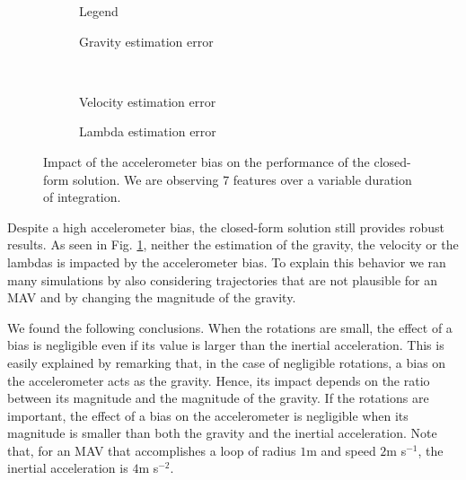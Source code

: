 \documentclass[letterpaper, 10 pt, journal, twoside]{IEEEtran}  %
\begin{document}
\begin{figure}[!h]
  \centering
        \hspace{0.2\columnwidth}%
        \begin{subfigure}[b]{0.3\columnwidth}
                \resizebox{\columnwidth}{!}{}
                \caption{Legend}

        \end{subfigure}%
        \begin{subfigure}[b]{0.5\columnwidth}
                \resizebox{\columnwidth}{!}{}
                \caption{Gravity estimation error}

        \end{subfigure}
        ~
        \begin{subfigure}[b]{0.5\columnwidth}
                \resizebox{\columnwidth}{!}{}
                \caption{Velocity estimation error}

        \end{subfigure}%
        \begin{subfigure}[b]{0.5\columnwidth}
                \resizebox{\columnwidth}{!}{}
                \caption{Lambda estimation error}

        \end{subfigure}
        \caption{Impact of the accelerometer bias on the performance of the closed-form solution. We are observing 7 features  over a variable duration of integration.\label{fig:biasAccCF}}
\end{figure}

Despite a high accelerometer bias, the closed-form solution still provides robust results.
As seen in Fig. \ref{fig:biasAccCF}, neither the estimation of the gravity, the velocity or the lambdas is impacted by the accelerometer bias.
To explain this behavior we ran many simulations by also considering trajectories that are not plausible for an MAV and by changing the magnitude of the gravity.

We found the following conclusions. When the rotations are small, the effect of a bias is negligible even if its value is larger than the inertial acceleration. This is easily explained by remarking that, in the case of negligible rotations, a bias on the accelerometer acts as the gravity. Hence, its impact depends on the ratio between its magnitude and the magnitude of the gravity.
If the rotations are important, the effect of a bias on the accelerometer is negligible when its magnitude is smaller than both the gravity and the inertial acceleration. Note that, for an MAV that accomplishes a loop of radius $1$m and speed $2$m s$^{-1}$, the inertial acceleration is $4$m s$^{-2}$.
\end{document}
